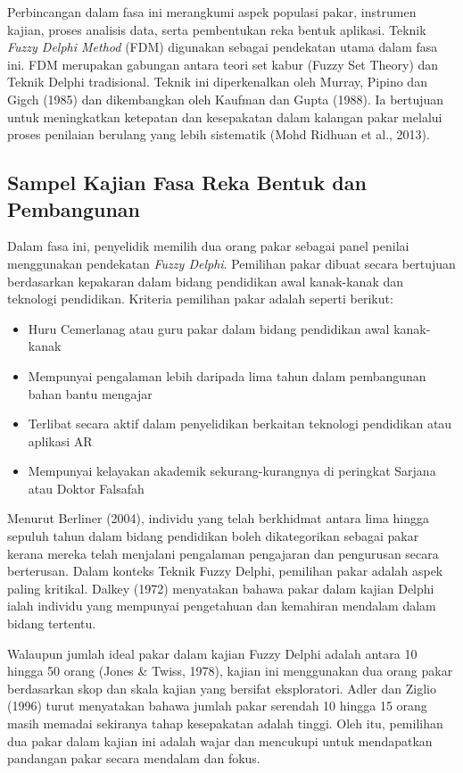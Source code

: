 \begin{itemize}
Perbincangan dalam fasa ini merangkumi aspek populasi pakar, instrumen kajian, proses analisis data, serta pembentukan reka bentuk aplikasi. Teknik \textit{Fuzzy Delphi Method} (FDM) digunakan sebagai pendekatan utama dalam fasa ini. FDM merupakan gabungan antara teori set kabur (Fuzzy Set Theory) dan Teknik Delphi tradisional. Teknik ini diperkenalkan oleh Murray, Pipino dan Gigch (1985) dan dikembangkan oleh Kaufman dan Gupta (1988). Ia bertujuan untuk meningkatkan ketepatan dan kesepakatan dalam kalangan pakar melalui proses penilaian berulang yang lebih sistematik (Mohd Ridhuan et al., 2013).
\subsection{Sampel Kajian Fasa Reka Bentuk dan Pembangunan}

Dalam fasa ini, penyelidik memilih dua orang pakar sebagai panel penilai menggunakan pendekatan \textit{Fuzzy Delphi}. Pemilihan pakar dibuat secara bertujuan berdasarkan kepakaran dalam bidang pendidikan awal kanak-kanak dan teknologi pendidikan. Kriteria pemilihan pakar adalah seperti berikut:

\begin{itemize}
  \item Huru Cemerlanag atau guru pakar dalam bidang pendidikan awal kanak-kanak
  \item Mempunyai pengalaman lebih daripada lima tahun dalam pembangunan bahan bantu mengajar
  \item Terlibat secara aktif dalam penyelidikan berkaitan teknologi pendidikan atau aplikasi AR
  \item Mempunyai kelayakan akademik sekurang-kurangnya di peringkat Sarjana atau Doktor Falsafah
\end{itemize}

Menurut Berliner (2004), individu yang telah berkhidmat antara lima hingga sepuluh tahun dalam bidang pendidikan boleh dikategorikan sebagai pakar kerana mereka telah menjalani pengalaman pengajaran dan pengurusan secara berterusan. Dalam konteks Teknik Fuzzy Delphi, pemilihan pakar adalah aspek paling kritikal. Dalkey (1972) menyatakan bahawa pakar dalam kajian Delphi ialah individu yang mempunyai pengetahuan dan kemahiran mendalam dalam bidang tertentu.

Walaupun jumlah ideal pakar dalam kajian Fuzzy Delphi adalah antara 10 hingga 50 orang (Jones \& Twiss, 1978), kajian ini menggunakan dua orang pakar berdasarkan skop dan skala kajian yang bersifat eksploratori. Adler dan Ziglio (1996) turut menyatakan bahawa jumlah pakar serendah 10 hingga 15 orang masih memadai sekiranya tahap kesepakatan adalah tinggi. Oleh itu, pemilihan dua pakar dalam kajian ini adalah wajar dan mencukupi untuk mendapatkan pandangan pakar secara mendalam dan fokus.

\end{itemize}
